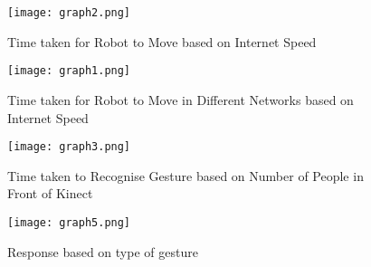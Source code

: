 \begin{figure}[H]
  \centering
  \texttt{[image: graph2.png]}
  \caption{Time taken for Robot to Move based on Internet Speed}
  \label{Internet speed based performance}	
\end{figure}


\begin{figure}[H]
  \centering
  \texttt{[image: graph1.png]}
  \caption{Time taken for Robot to Move in Different Networks based on Internet Speed}
  \label{Network based performance}	
\end{figure}

\begin{figure}[H]
  \centering
  \texttt{[image: graph3.png]}
  \caption{Time taken to Recognise Gesture based on Number of People in Front of Kinect}
  \label{Kinect performance}	
\end{figure}


\begin{figure}[H]
  \centering
  \texttt{[image: graph5.png]}
  \caption{Response based on type of gesture}
  \label{Gesture-action pair}	
\end{figure}


